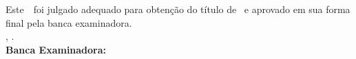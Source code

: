 \imprimircapa

\imprimirfolhaderosto*

\begin{fichacatalografica}
	
\end{fichacatalografica}

\setlength{\ABNTEXsignwidth}{10cm}

\begin{folhadeaprovacao}
	\OnehalfSpacing
	\centering
	\imprimirautor\\%
	\vspace*{10pt}		
	\textbf{\imprimirtitulo}%
	\ifnotempty{\imprimirsubtitulo}{:~\imprimirsubtitulo}\\%
	\vspace*{\baselineskip}
	Este~\imprimirtipotrabalho~foi julgado adequado para obtenção do título de \imprimirformacao~e aprovado em sua forma final pela banca examinadora. \\
		\vspace*{\baselineskip}
	\imprimirlocal, \imprimirdata. \\
	\vspace*{2\baselineskip}
	\vspace*{2\baselineskip}
	\textbf{Banca Examinadora:} \\
	\vspace*{\baselineskip}
	\vspace*{\baselineskip}

	\vspace*{\baselineskip}


\end{folhadeaprovacao}


